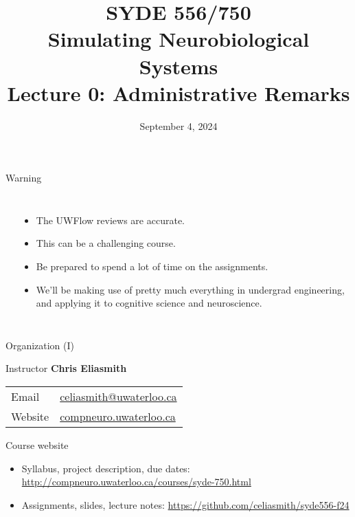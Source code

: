 \documentclass[aspectratio=169]{beamer}
\date{September 4, 2024}
\title{SYDE 556/750 \\ Simulating Neurobiological Systems \\ Lecture 0: Administrative Remarks}
\begin{document}
	
\begin{frame}{}
	\MakeTitle
\end{frame}

\begin{frame}{Warning}
	\begin{columns}[T]
		\fboxrule=0.4pt\fboxsep=0pt\\
		\begin{itemize}
			\item The UWFlow reviews are accurate. 
			\item This can be a challenging course.
			\item Be prepared to spend a lot of time on the assignments.
			\item We'll be making use of pretty much everything in undergrad engineering,
			      and applying it to cognitive science and neuroscience.
		\end{itemize}
	\end{columns}
\end{frame}

\begin{frame}{Organization (I)}
	\begin{block}{Instructor}
		\vspace{2mm}
		\textbf{Chris Eliasmith}\\[2mm]
		\hspace{-2.5mm}\begin{tabular}{l l}
			Email & \url{celiasmith@uwaterloo.ca}\\
			Website & \url{compneuro.uwaterloo.ca}\\
		\end{tabular}
	\end{block}
 
	\vfill

	\begin{block}{Course website}
		\begin{itemize}
      \item Syllabus, project description, due dates: \url{http://compneuro.uwaterloo.ca/courses/syde-750.html}
			\item Assignments, slides, lecture notes: \url{https://github.com/celiasmith/syde556-f24}
		\end{itemize}
	\end{block}
\end{frame}
\end{document}
